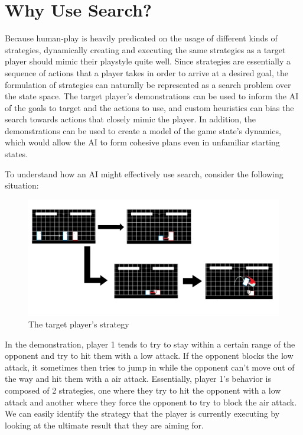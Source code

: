\section{Why Use Search?}

Because human-play is heavily predicated on the usage of different kinds of strategies, dynamically creating and executing the same strategies as a target player should mimic their playstyle quite well. Since strategies are essentially a sequence of actions that a player takes in order to arrive at a desired goal, the formulation of strategies can naturally be represented as a search problem over the state space. The target player's demonstrations can be used to inform the AI of the goals to target and the actions to use, and custom heuristics can bias the search towards actions that closely mimic the player. In addition, the demonstrations can be used to create a model of the game state's dynamics, which would allow the AI to form cohesive plans even in unfamiliar starting states. 

To understand how an AI might effectively use search, consider the following situation:

\begin{figure}[h]
	\centering
	\includegraphics[width=\textwidth]{Figures/Flowchart.png}
	\caption{The target player's strategy}
	\label{Player Strategy}
\end{figure}

In the demonstration, player 1 tends to try to stay within a certain range of the opponent and try to hit them with a low attack. If the opponent blocks the low attack, it sometimes then tries to jump in while the opponent can't move out of the way and hit them with a air attack. Essentially, player 1's behavior is composed of 2 strategies, one where they try to hit the opponent with a low attack and another where they force the opponent to try to block the air attack. We can easily identify the strategy that the player is currently executing by looking at the ultimate result that they are aiming for.

